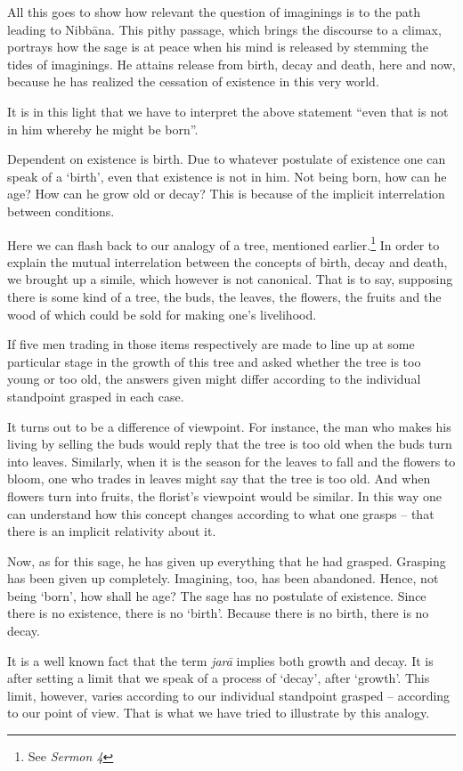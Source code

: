 All this goes to show how relevant the question of imaginings is to the path leading to Nibbāna. This pithy passage, which brings the discourse to a climax, portrays how the sage is at peace when his mind is released by stemming the tides of imaginings. He attains release from birth, decay and death, here and now, because he has realized the cessation of existence in this very world.

It is in this light that we have to interpret the above statement ``even that is not in him whereby he might be born''.

Dependent on existence is birth. Due to whatever postulate of existence one can speak of a `birth', even that existence is not in him. Not being born, how can he age? How can he grow old or decay? This is because of the implicit interrelation between conditions.

Here we can flash back to our analogy of a tree, mentioned earlier.\footnote{See \emph{Sermon 4}} In order to explain the mutual interrelation between the concepts of birth, decay and death, we brought up a simile, which however is not canonical. That is to say, supposing there is some kind of a tree, the buds, the leaves, the flowers, the fruits and the wood of which could be sold for making one's livelihood.

If five men trading in those items respectively are made to line up at some particular stage in the growth of this tree and asked whether the tree is too young or too old, the answers given might differ according to the individual standpoint grasped in each case.

It turns out to be a difference of viewpoint. For instance, the man who makes his living by selling the buds would reply that the tree is too old when the buds turn into leaves. Similarly, when it is the season for the leaves to fall and the flowers to bloom, one who trades in leaves might say that the tree is too old. And when flowers turn into fruits, the florist's viewpoint would be similar. In this way one can understand how this concept changes according to what one grasps -- that there is an implicit relativity about it.

Now, as for this sage, he has given up everything that he had grasped. Grasping has been given up completely. Imagining, too, has been abandoned. Hence, not being `born', how shall he age? The sage has no postulate of existence. Since there is no existence, there is no `birth'. Because there is no birth, there is no decay.

It is a well known fact that the term \emph{jarā} implies both growth and decay. It is after setting a limit that we speak of a process of `decay', after `growth'. This limit, however, varies according to our individual standpoint grasped -- according to our point of view. That is what we have tried to illustrate by this analogy.

